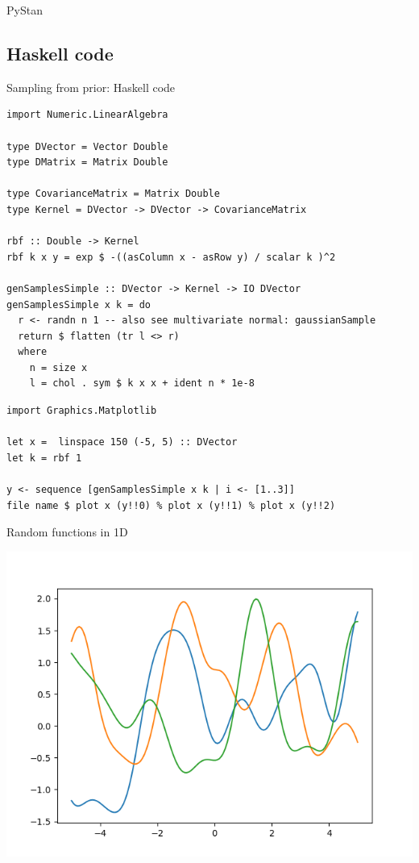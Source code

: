 \documentclass[presentation]{beamer}
\begin{document}
\begin{frame}[label={sec:org1ea5bba}]{PyStan}
\end{frame}

\subsection{Haskell code}
\label{sec:org6129ca5}

\begin{frame}[fragile,label={sec:org059fbf5}]{Sampling from prior: Haskell code}
 \begin{verbatim}
import Numeric.LinearAlgebra

type DVector = Vector Double
type DMatrix = Matrix Double

type CovarianceMatrix = Matrix Double
type Kernel = DVector -> DVector -> CovarianceMatrix 

rbf :: Double -> Kernel
rbf k x y = exp $ -((asColumn x - asRow y) / scalar k )^2

genSamplesSimple :: DVector -> Kernel -> IO DVector
genSamplesSimple x k = do
  r <- randn n 1 -- also see multivariate normal: gaussianSample
  return $ flatten (tr l <> r)
  where
    n = size x
    l = chol . sym $ k x x + ident n * 1e-8
\end{verbatim}

\begin{verbatim}
import Graphics.Matplotlib

let x =  linspace 150 (-5, 5) :: DVector
let k = rbf 1

y <- sequence [genSamplesSimple x k | i <- [1..3]]
file name $ plot x (y!!0) % plot x (y!!1) % plot x (y!!2)
\end{verbatim}
\end{frame}

\begin{frame}[label={sec:org093c850}]{Random functions in 1D}
\begin{center}
\includegraphics[width=.9\linewidth]{images/fig07.png}
\end{center}
\end{frame}
\end{document}
